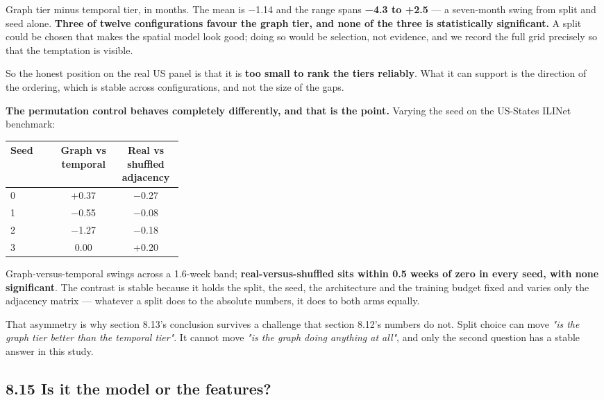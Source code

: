 \documentclass[11pt,a4paper]{article}
\begin{document}
Graph tier minus temporal tier, in months. The mean is −1.14 and the range spans \textbf{−4.3 to +2.5} — a seven-month swing from split and seed alone. \textbf{Three of twelve configurations favour the graph tier, and none of the three is statistically significant.} A split could be chosen that makes the spatial model look good; doing so would be selection, not evidence, and we record the full grid precisely so that the temptation is visible.

So the honest position on the real US panel is that it is \textbf{too small to rank the tiers reliably}. What it can support is the direction of the ordering, which is stable across configurations, and not the size of the gaps.

\textbf{The permutation control behaves completely differently, and that is the point.} Varying the seed on the US-States ILINet benchmark:

\begin{center}\small
\begin{tabular}{p{0.29\linewidth}cc}\toprule
\textbf{Seed} & \textbf{Graph vs temporal} & \textbf{\textbf{Real vs shuffled adjacency}} \\ \midrule
0 & +0.37 & −0.27 \\
1 & −0.55 & −0.08 \\
2 & −1.27 & −0.18 \\
3 & 0.00 & +0.20 \\
\bottomrule\end{tabular}
\end{center}

Graph-versus-temporal swings across a 1.6-week band; \textbf{real-versus-shuffled sits within 0.5 weeks of zero in every seed, with none significant}. The contrast is stable because it holds the split, the seed, the architecture and the training budget fixed and varies only the adjacency matrix — whatever a split does to the absolute numbers, it does to both arms equally.

That asymmetry is why section 8.13's conclusion survives a challenge that section 8.12's numbers do not. Split choice can move \emph{"is the graph tier better than the temporal tier"}. It cannot move \emph{"is the graph doing anything at all"}, and only the second question has a stable answer in this study.

\subsection*{8.15 Is it the model or the features?}
\end{document}
